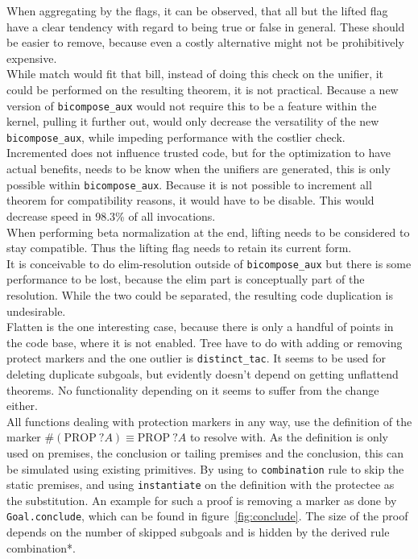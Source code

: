 When aggregating by the flags, it can be observed, that all but the lifted flag have a clear tendency with regard to being true or false in general. These should be easier to remove, because even a costly alternative might not be prohibitively expensive.\\
While match would fit that bill, instead of doing this check on the unifier, it could be performed on the resulting theorem, it is not practical. Because a new version of \texttt{bicompose\_aux} would not require this to be a feature within the kernel, pulling it further out, would only decrease the versatility of the new \texttt{bicompose\_aux}, while impeding performance with the costlier check.\\
Incremented does not influence trusted code, but for the optimization to have actual benefits, needs to be know when the unifiers are generated, this is only possible within \texttt{bicompose\_aux}. Because it is not possible to increment all theorem for compatibility reasons, it would have to be disable. This would decrease speed in 98.3\% of all invocations.\\
When performing beta normalization at the end, lifting needs to be considered to stay compatible. Thus the lifting flag needs to retain its current form.\\
It is conceivable to do elim-resolution outside of \texttt{bicompose\_aux} but there is some performance to be lost, because the elim part is conceptually part of the resolution. While the two could be separated, the resulting code duplication is undesirable.\\
Flatten is the one interesting case, because there is only a handful of points in the code base, where it is not enabled. Tree have to do with adding or removing protect markers and the one outlier is \texttt{distinct\_tac}. It seems to be used for deleting duplicate subgoals, but evidently doesn't depend on getting unflattend theorems. No functionality depending on it seems to suffer from the change either.\\
All functions dealing with protection markers in any way, use the definition of the marker $\#(\text{PROP}~?A) \equiv \text{PROP}~?A$ to resolve with. As the definition is only used on premises, the conclusion or tailing premises and the conclusion, this can be simulated using existing primitives. By using to \texttt{combination} rule to skip the static premises, and using \texttt{instantiate} on the definition with the protectee as the substitution. An example for such a proof is removing a marker as done by \texttt{Goal.conclude}, which can be found in figure~\ref{fig:conclude}. The size of the proof depends on the number of skipped subgoals and is hidden by the derived rule combination*.

